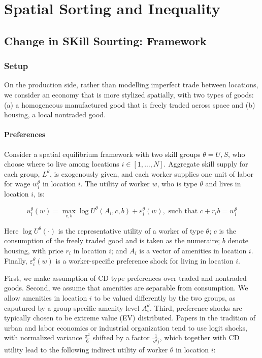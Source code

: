 \chapter{Spatial Sorting and Inequality}

\section{Change in SKill Sourting: Framework}

\subsection{Setup}

On the production side, rather than modelling imperfect trade between locations, we consider an economy that is more stylized spatially, with two types of goods: (a) a homogeneous manufactured good that is freely traded across space and (b) housing, a local nontraded good.

\subsubsection{Preferences}

Consider a spatial equilibrium framework with two skill groups $\theta = U, S$, who choose where to live among locations $i \in [1, \ldots, N]$. Aggregate skill supply for each group, $L^{\theta}$, is exogenously given, and each worker supplies one unit of labor for wage $w_i^{\theta}$ in location $i$. The utility of worker $w$, who is type $\theta$ and lives in location $i$, is:

\begin{equation}
  u_i^{\theta}(w) = \max_{c, b} \log U^{\theta}(A_i, c, b) + \varepsilon_i^{\theta}(w), \text{ such that } c + r_i b = w_i^{\theta} 
\end{equation}

Here $\log U^{\theta}(\cdot)$ is the representative utility of a worker of type $\theta$; $c$ is the consumption of the freely traded good and is taken as the numeraire; $b$ denote housing, with price $r_i$ in location $i$; and $A_i$ is a vector of amenities in location $i$. Finally, $\varepsilon_i^{\theta}(w)$ is a worker-specific preference shock for living in location $i$.

First, we make assumption of CD type preferences over traded and nontraded goods. Second, we assume that amenities are separable from consumption. We allow amenities in location $i$ to be valued differently by the two groups, as caputured by a group-specific amenity level $A_i^{\theta}$. Third, preference shocks are typically chosen to be extreme value (EV) distributed. Papers in the tradition of urban and labor economics or industrial organization tend to use logit shocks, with normalized variance $\frac{\pi^2}{6}$ shifted by a factor $\frac{1}{\kappa^{\theta})}$, which together with CD utility lead to the following indirect utility of worker $\theta$ in location $i$:

